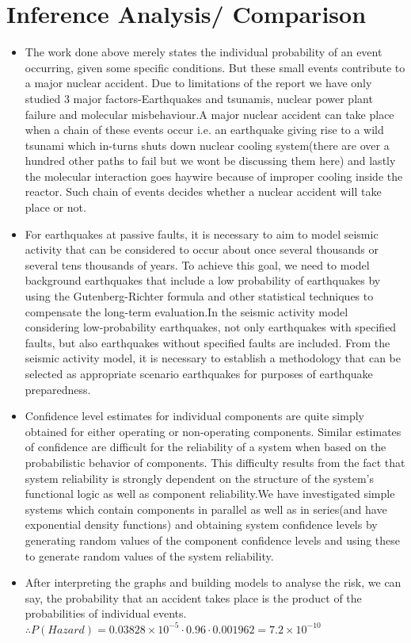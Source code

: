 \documentclass{article}
\begin{document}
\section{Inference Analysis/ Comparison}

\begin{itemize}

\item The work done above merely states the individual probability of an event occurring, given some specific conditions. But these small events contribute to a major nuclear accident. Due to limitations of the report we have only studied 3 major factors-Earthquakes and tsunamis, nuclear power plant failure and molecular misbehaviour.A major nuclear accident can take place when a chain of these events occur i.e. an earthquake giving rise to a wild tsunami which in-turns shuts down nuclear cooling system(there are over a hundred other paths to fail but we wont be discussing them here) and lastly the molecular interaction goes haywire because of improper cooling inside the reactor. Such chain of events decides whether a nuclear accident will take place or not.
\item For  earthquakes at passive faults, it is necessary to aim to model seismic activity that can be considered to occur about once several thousands or several tens thousands of years. To achieve this goal, we need to model background earthquakes that include a low probability of earthquakes by using the Gutenberg-Richter formula and other statistical techniques to compensate the long-term evaluation.In the seismic activity model considering low-probability earthquakes, not only earthquakes with specified faults, but also earthquakes without specified faults are included. From the seismic activity model, it is necessary to establish a methodology that can be selected as appropriate scenario earthquakes for purposes of earthquake preparedness.
\item Confidence level estimates for individual components are quite simply obtained for either operating or non-operating components. Similar estimates of confidence are difficult for the reliability of a system when based on the probabilistic behavior of components.  This difficulty results from the fact that system reliability is strongly dependent on the structure of the system's functional logic as well as component reliability.We have investigated simple systems which contain components in parallel as well as in series(and have exponential density functions) and obtaining system confidence levels by generating random values of the component confidence levels and using these to generate random values of the system reliability.  

\item After interpreting the graphs and building models to analyse the risk, we can say, the probability that an accident takes place is the product of the probabilities of individual events.\\
$\therefore P(Hazard)=0.03828 \times 10^{-5}\cdot 0.96 \cdot 0.001962 = 7.2 \times 10^{-10}$
\end{itemize}
\end{document}
